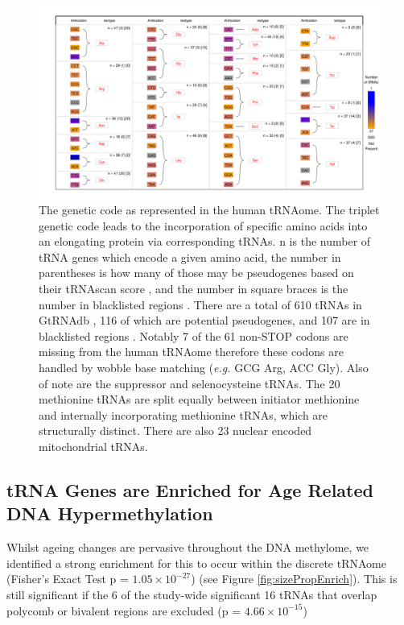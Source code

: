 \documentclass[
]{book}
\begin{document}
\begin{figure}

{\centering \includegraphics[width=1\linewidth]{figs/kutteresq_BLcount} 

}

\caption{The genetic code as represented in the human tRNAome. The triplet genetic code leads to the incorporation of specific amino acids into an elongating protein via corresponding tRNAs. n is the number of tRNA genes which encode a given amino acid, the number in parentheses is how many of those may be pseudogenes based on their tRNAscan score \citep{Lowe2016}, and the number in square braces is the number in blacklisted regions \citep{Amemiya2019}. There are a total of 610 tRNAs in GtRNAdb \citep{Chan2009}, 116 of which are potential pseudogenes, and 107 are in blacklisted regions \citep{Amemiya2019}. Notably 7 of the 61 non-STOP codons are missing from the human tRNAome therefore these codons are handled by wobble base matching (\emph{e.g.} GCG Arg, ACC Gly). Also of note are the suppressor and selenocysteine tRNAs. The 20 methionine tRNAs are split equally between initiator methionine and internally incorporating methionine tRNAs, which are structurally distinct. There are also 23 nuclear encoded mitochondrial tRNAs.}\label{fig:kutteresq}
\end{figure}



\hypertarget{trna-genes-are-enriched-for-age-related-dna-hypermethylation}{%
\subsection{tRNA Genes are Enriched for Age Related DNA Hypermethylation}\label{trna-genes-are-enriched-for-age-related-dna-hypermethylation}}

Whilst ageing changes are pervasive throughout the DNA methylome, we identified a strong enrichment for this to occur within the discrete tRNAome (Fisher's Exact Test p = \(1.05\times10^{-27}\)) (see Figure \ref{fig:sizePropEnrich}).
This is still significant if the 6 of the study-wide significant 16 tRNAs that overlap polycomb or bivalent regions are excluded (p = \(4.66\times10^{-15}\))
\end{document}
